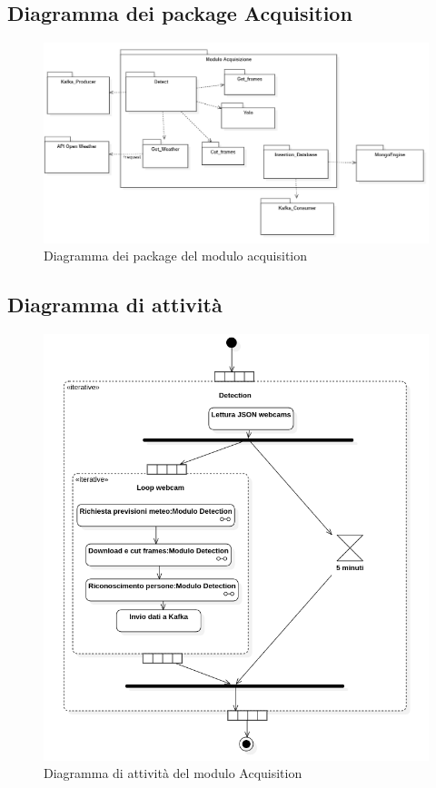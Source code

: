 \subsection{Diagramma dei package Acquisition}\label{DiagrammaDeiPackageAcquisition}
\begin{center}
	\begin{figure}[H]
		\centering\includegraphics[scale=0.65]{../immagini/diag_PB/diag_pack_acqui.png}
		\caption{Diagramma dei package del modulo acquisition}
	\end{figure}
\end{center}

\subsection{Diagramma di attività}
\begin{center}
	\begin{figure}[H]
		\centering\includegraphics[scale=0.65]
    {../immagini/diag_PB/detection.png}
		\caption{Diagramma di attività del modulo Acquisition}
	\end{figure}
\end{center}


